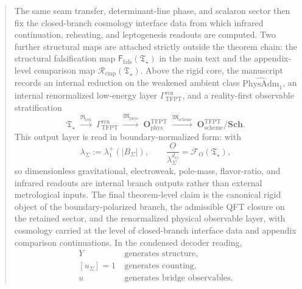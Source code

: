 \documentclass[11pt,a4paper]{article}
\theoremstyle{definition}
\theoremstyle{remark}
\newcommand{\Tstar}{\mathfrak T_{\star}}
\newcommand{\Ffals}{\mathsf F_{\mathrm{fals}}}
\newcommand{\Rcmp}{\mathcal R_{\mathrm{cmp}}}
\newcommand{\PhysAdmOne}{\widehat{\mathrm{PhysAdm}}_1}
\newcommand{\GrenTFPT}{\Gamma_{\mathrm{TFPT}}^{\mathrm{ren}}}
\newcommand{\OphysTFPT}{\mathbf O_{\mathrm{phys}}^{\mathrm{TFPT}}}
\newcommand{\OschemeTFPT}{\mathbf O_{\mathrm{scheme}}^{\mathrm{TFPT}}}
\newcommand{\SchGrp}{\mathbf{Sch}}
\newcommand{\Mphys}{\mathfrak M_{\mathrm{phys}}}
\newcommand{\Mscheme}{\mathfrak M_{\mathrm{scheme}}}
\newcommand{\Rren}{\mathfrak R_{\mathrm{ren}}}
\begin{document}
\begin{abstract}
The same seam transfer, determinant-line phase, and scalaron sector then fix the closed-branch
cosmology interface data from which infrared continuation, reheating, and leptogenesis readouts are
computed. Two further structural maps are attached strictly outside the theorem chain: the
structural falsification map $\Ffals(\Tstar)$ in the main text and the appendix-level comparison
map $\Rcmp(\Tstar)$. Above the rigid core, the manuscript records an internal reduction on the
weakened ambient class $\PhysAdmOne$, an internal renormalized low-energy layer $\GrenTFPT$, and a
reality-first observable stratification
\[
\Tstar\;\xrightarrow{\Rren}\;\GrenTFPT\;\xrightarrow{\Mphys}\;\OphysTFPT
\;\xrightarrow{\Mscheme}\;\OschemeTFPT/\SchGrp.
\]
This output layer is read in boundary-normalized form: with
\[
\lambda_\Sigma:=\lambda_1^+(|B_\Sigma|),
\qquad
\frac{O}{\lambda_\Sigma^{d_O}}=\mathcal F_O(\Tstar),
\]
so dimensionless gravitational, electroweak, pole-mass, flavor-ratio, and infrared readouts are
internal branch outputs rather than external metrological inputs.
The final theorem-level claim is the canonical rigid object of the boundary-polarized branch, the
admissible QFT closure on the retained sector, and the renormalized physical observable layer, with
cosmology carried at the level of closed-branch interface data and appendix comparison
continuations. In the condensed decoder reading,
\[
\begin{aligned}
Y&\ \text{generates structure},\\
[u_\Sigma]=1&\ \text{generates counting},\\
u&\ \text{generates bridge observables}.
\end{aligned}
\]
\end{abstract}
\end{document}
